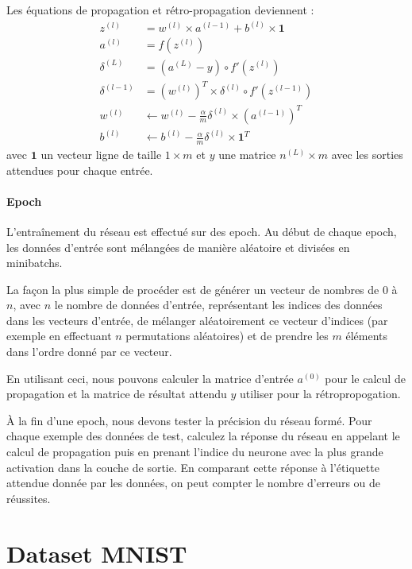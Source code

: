 \documentclass[11pt]{paper}
\begin{document}
Les équations de propagation et rétro-propagation deviennent :
\begin{align*}
z^{(l)} &= w^{(l)} \times a^{(l-1)} + b^{(l)} \times \mathbf{1}\\
a^{(l)} &= f \left (z^{(l)} \right)\\
\delta^{(L)} &= (a^{(L)} - y)  \circ f'(z^{(l)})\\
\delta^{(l-1)} &= (w^{(l)})^T \times \delta^{(l)} \circ f'(z^{(l-1)})\\
w^{(l)} &\leftarrow w^{(l)} - \frac{\alpha}{m} \delta^{(l)} \times (a^{(l-1)})^T\\
b^{(l)} &\leftarrow b^{(l)} - \frac{\alpha}{m} \delta^{(l)} \times \mathbf{1}^T
\end{align*}
avec $\mathbf{1}$ un vecteur ligne de taille $1 \times m$ et $y$ une matrice $n^{(L)} \times m$ avec les sorties attendues pour chaque entrée.

\paragraph{Epoch} 

L'entraînement du réseau est effectué sur des epoch. Au début de chaque epoch, les données d'entrée sont mélangées de manière aléatoire et divisées en minibatchs.

La façon la plus simple de procéder est de générer un vecteur de nombres de 0 à $n$, avec $n$ le nombre de données d'entrée, représentant les indices des données dans les vecteurs d'entrée, de mélanger aléatoirement ce vecteur d'indices (par exemple en effectuant $n$ permutations aléatoires) et de prendre les $m$ éléments dans l'ordre donné par ce vecteur.

En utilisant ceci, nous pouvons calculer la matrice d'entrée $a^{(0)}$ pour le calcul de propagation et la matrice de résultat attendu $y$ utiliser   pour la rétropropogation.

À la fin d'une epoch, nous devons tester la précision du réseau formé. Pour chaque exemple des données de test, calculez la réponse du réseau en appelant le calcul de propagation puis en prenant l'indice du neurone avec la plus grande activation dans la couche de sortie. En comparant cette réponse à l'étiquette attendue donnée par les données, on peut compter le nombre d'erreurs ou de réussites. 

  \section*{Dataset MNIST}
\end{document}
